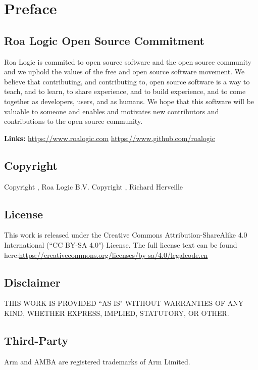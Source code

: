 \chapter{Preface}\label{preface}

\section{Roa Logic Open Source Commitment}
Roa Logic is commited to open source software and the open source community and we uphold the values of the free and open source software movement.
We believe that contributing, and contributing to, open source software is a way to teach, and to learn, to share experience, and to build experience, and to come together as developers, users, and as humans.
We hope that this software will be valuable to someone and enables and motivates new contributors and contributions to the open source community.

\noindent\textbf{Links:}\newline
\url{https://www.roalogic.com}\newline
\url{https://www.github.com/roalogic}


\section{Copyright}

Copyright , Roa Logic B.V.\newline
Copyright , Richard Herveille


\section{License}

This work is released under the Creative Commons Attribution-ShareAlike 4.0 International (``CC BY-SA 4.0") License.
The full license text can be found here:\newline \url{https://creativecommons.org/licenses/by-sa/4.0/legalcode.en}


\section{Disclaimer}

THIS WORK IS PROVIDED ``AS IS" WITHOUT WARRANTIES OF ANY KIND, WHETHER EXPRESS, IMPLIED, STATUTORY, OR OTHER.


\section{Third-Party}

Arm and AMBA are registered trademarks of Arm Limited.

